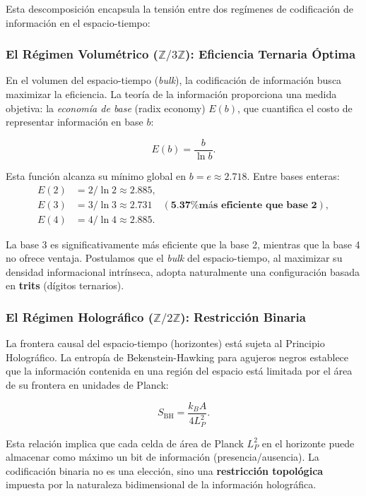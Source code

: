 \documentclass[12pt, a4paper]{article}
\theoremstyle{plain}
\theoremstyle{definition}
\begin{document}
Esta descomposición encapsula la tensión entre dos regímenes de codificación de información en el espacio-tiempo:

\subsubsection{El Régimen Volumétrico ($\mathbb{Z}/3\mathbb{Z}$): Eficiencia Ternaria Óptima}

En el volumen del espacio-tiempo (\textit{bulk}), la codificación de información busca maximizar la eficiencia. La teoría de la información proporciona una medida objetiva: la \textit{economía de base} (radix economy) $E(b)$, que cuantifica el costo de representar información en base $b$:

\begin{equation}
E(b) = \frac{b}{\ln b}.
\end{equation}

Esta función alcanza su mínimo global en $b = e \approx 2.718$. Entre bases enteras:
\begin{align}
E(2) &= 2/\ln 2 \approx 2.885, \\
E(3) &= 3/\ln 3 \approx 2.731 \quad (\textbf{5.37\% más eficiente que base 2}), \\
E(4) &= 4/\ln 4 \approx 2.885.
\end{align}

La base 3 es significativamente más eficiente que la base 2, mientras que la base 4 no ofrece ventaja. Postulamos que el \textit{bulk} del espacio-tiempo, al maximizar su densidad informacional intrínseca, adopta naturalmente una configuración basada en \textbf{trits} (dígitos ternarios).

\subsubsection{El Régimen Holográfico ($\mathbb{Z}/2\mathbb{Z}$): Restricción Binaria}

La frontera causal del espacio-tiempo (horizontes) está sujeta al Principio Holográfico. La entropía de Bekenstein-Hawking para agujeros negros establece que la información contenida en una región del espacio está limitada por el área de su frontera en unidades de Planck:

\begin{equation}
S_{\text{BH}} = \frac{k_B A}{4L_P^2}.
\end{equation}

Esta relación implica que cada celda de área de Planck $L_P^2$ en el horizonte puede almacenar como máximo un bit de información (presencia/ausencia). La codificación binaria no es una elección, sino una \textbf{restricción topológica} impuesta por la naturaleza bidimensional de la información holográfica.
\end{document}
